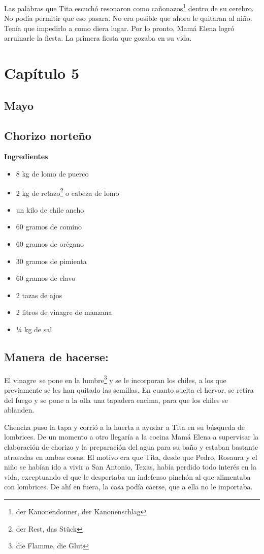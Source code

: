 Las palabras que Tita escuchó resonaron como cañonazos\footnote{der Kanonendonner, der Kanonenschlag} dentro
de su cerebro. No podía permitir que eso pasara. No era posible que ahora le
quitaran al niño. Tenía que impedirlo a como diera lugar. Por lo pronto,
Mamá Elena logró arruinarle la fiesta. La primera fiesta que gozaba en
su vida.


\clearpage

\section*{ Capítulo 5 }
\subsection*{ Mayo }
\subsection*{ Chorizo norteño }
\textbf{Ingredientes}

\begin{itemize}
    \item 8 kg de lomo de puerco
    \item 2 kg de retazo\footnote{der Rest, das Stück} o cabeza de lomo
    \item un kilo de chile ancho
    \item 60 gramos de comino
    \item 60 gramos de orégano
    \item 30 gramos de pimienta
    \item 60 gramos de clavo
    \item 2 tazas de ajos
    \item 2 litros de vinagre de manzana
    \item ¼ kg de sal
\end{itemize}

\subsection*{ Manera de hacerse: }
El vinagre~se pone en la lumbre\footnote{die Flamme, die Glut}
y se le incorporan los chiles, a
los que previamente se les han quitado las semillas. En cuanto suelta el
hervor, se retira del fuego y se pone a la olla una tapadera encima,
para que los chiles se ablanden.

Chencha puso la tapa y corrió a la huerta a ayudar a Tita en su
búsqueda de lombrices. De un momento a otro llegaría a la cocina Mamá
Elena a supervisar la elaboración de chorizo y la preparación del agua
para su baño y estaban bastante atrasadas en ambas cosas. El motivo era
que Tita, desde que Pedro, Rosaura y el niño se habían ido a vivir a San
Antonio, Texas, había perdido todo interés en la vida, exceptuando el
que le despertaba un indefenso pinchón al que alimentaba con lombrices.
De ahí en fuera, la casa podía caerse, que a ella no le importaba.

